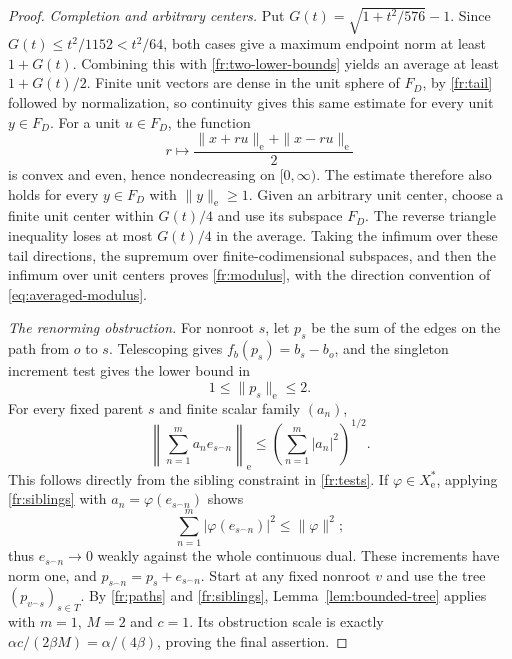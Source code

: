 \begin{proof}
\emph{Completion and arbitrary centers.}
Put $G(t)=\sqrt{1+t^2/576}-1$.  Since
$G(t)\le t^2/1152<t^2/64$, both cases give a maximum endpoint norm
at least $1+G(t)$.  Combining this with \eqref{fr:two-lower-bounds}
yields an average at least $1+G(t)/2$.
Finite unit vectors are dense in the unit sphere of $F_D$, by
\eqref{fr:tail} followed by normalization, so continuity gives this
same estimate for every unit $y\in F_D$.
For a unit $u\in F_D$, the function
\[
 r\longmapsto\frac{\|x+ru\|_{\mathrm e}+\|x-ru\|_{\mathrm e}}2
\]
is convex and even, hence nondecreasing on $[0,\infty)$.  The estimate
therefore also holds for every $y\in F_D$ with $\|y\|_{\mathrm e}\ge1$.
Given an arbitrary unit center, choose a finite unit center within
$G(t)/4$ and use its subspace $F_D$.  The reverse triangle inequality
loses at most $G(t)/4$ in the average.  Taking the infimum over these
tail directions, the supremum over finite-codimensional subspaces, and
then the infimum over unit centers proves \eqref{fr:modulus}, with the
direction convention of \eqref{eq:averaged-modulus}.

\emph{The renorming obstruction.}
For nonroot $s$, let $p_s$ be the sum of the edges on the path from
$o$ to $s$.  Telescoping gives $f_b(p_s)=b_s-b_o$, and the singleton
increment test gives the lower bound in
\begin{equation}
 1\le\|p_s\|_{\mathrm e}\le2.
 \label{fr:paths}
\end{equation}
For every fixed parent $s$ and finite scalar family $(a_n)$,
\begin{equation}
 \left\|\sum_{n=1}^m a_ne_{s^\frown n}\right\|_{\mathrm e}
 \le\left(\sum_{n=1}^m|a_n|^2\right)^{1/2}.
 \label{fr:siblings}
\end{equation}
This follows directly from the sibling constraint in
\eqref{fr:tests}.  If $\varphi\in X_{\mathrm e}^*$, applying
\eqref{fr:siblings} with $a_n=\varphi(e_{s^\frown n})$ shows
\[
 \sum_{n=1}^m|\varphi(e_{s^\frown n})|^2\le\|\varphi\|^2;
\]
thus $e_{s^\frown n}\to0$ weakly against the whole continuous dual.
These increments have norm one, and
$p_{s^\frown n}=p_s+e_{s^\frown n}$.
Start at any fixed nonroot $v$ and use the tree
$(p_{v^\frown s})_{s\in T}$.  By \eqref{fr:paths} and
\eqref{fr:siblings}, Lemma~\ref{lem:bounded-tree} applies with
$m=1$, $M=2$ and $c=1$.  Its obstruction scale is exactly
$\alpha c/(2\beta M)=\alpha/(4\beta)$, proving the final assertion.
\end{proof}
